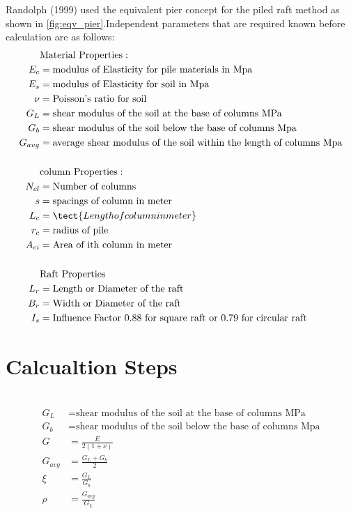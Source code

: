 \documentclass[12pt]{article}
\begin{document}
Randolph (1999) used the equivalent pier concept for the piled raft method as shown in \ref{fig:eqv_pier}.Independent parameters that are required known before calculation are as follows:
\begin{equation*}
\begin{align*}
&\text{Material Properties}:\\
E_c&=\text{modulus of Elasticity for pile materials in Mpa}\\
E_s&=\text{modulus of Elasticity for soil in Mpa}\\
\nu &=\text{Poisson's ratio for soil}\\
G_L&=\text{shear modulus of the soil at the base of columns MPa}\\
G_b&=\text{shear modulus of the soil below the base of columns Mpa}\\
G_{avg}&=\text{average shear modulus of the soil within the length of columns Mpa}\\\\
&\text{column Properties}:\\
N_{cl}&=\text{Number of columns}\\
s&=\text{spacings of column in meter}\\
L_c&=\tect{Length of column in meter}\\
r_c&=\text{radius of pile}\\
A_{ci}&=\text{Area of ith column in meter}\\\\
&\text{Raft Properties}\\
L_r&=\text{Length or Diameter of the raft}\\
B_r&=\text{Width or Diameter of the raft}\\
I_s&=\text{Influence Factor 0.88 for square raft or 0.79 for circular raft}\\
\end{align*}
\end{equation*}

\section{Calcualtion Steps}
\noindent {}\\
\begin{equation*}
\begin{align*}
G_L&=\text{shear modulus of the soil at the base of columns MPa}\\
G_b&=\text{shear modulus of the soil below the base of columns Mpa}\\
G&=\frac{E}{2(1+\nu)}\\
G_{avg}&=\frac{G_L+G_b}{2}\\
\xi&=\frac{G_L}{G_b}\\
\rho&=\frac{G_{avg}}{G_L}
\end{align*}
\end{equation*}
\end{document}
